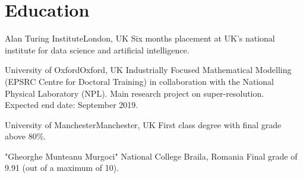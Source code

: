\documentclass[11pt,a4paper,roman]{moderncv} %
\begin{document}


\section{Education}

        {Alan Turing Institute}{London, UK}{}
        {
          Six months placement at UK's national institute for
          data science and artificial intelligence.
        }

        {University of Oxford}{Oxford, UK}{}
        {
          Industrially Focused Mathematical Modelling 
          (EPSRC Centre for Doctoral Training) 
          in collaboration with the National Physical Laboratory (NPL). 
          Main research project on super-resolution. 
          \\ 
          Expected end date: September 2019.
        }

        {University of Manchester}{Manchester, UK}{}
        {
          First class degree with final grade above 80\%.
        }
  
        {"Gheorghe Munteanu Murgoci" National College}
        {Braila, Romania}{}
        {Final grade of 9.91 (out of a maximum of 10).}


\end{document}
